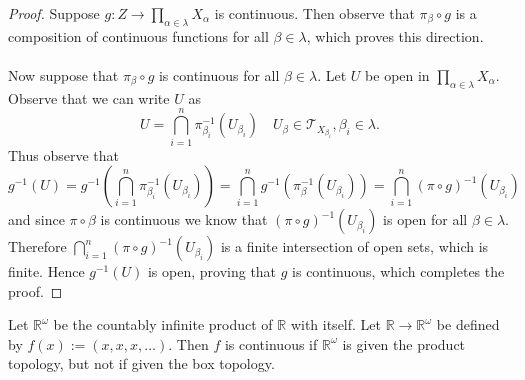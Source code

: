 \documentclass[letter,12pt,twoside]{hmcpset}
\begin{document}
\begin{proof}
    Suppose $g: Z \to \prod\limits_{\alpha\in \lambda}X_\alpha$
    is continuous. Then observe that $\pi_\beta \circ g$ is a
    composition of continuous functions for all $\beta \in \lambda$,
    which proves this direction.
    \\
    \\
    Now suppose that $\pi_\beta \circ g$ is continuous for all $\beta
    \in \lambda$. Let $U$ be open in $\prod\limits_{\alpha \in
    \lambda} X_\alpha$. Observe that we can write $U$ as 
    \[
        U = \bigcap\limits_{i = 1}^{n} \pi^{-1}_{\beta_i}(U_{\beta_i}) \quad U_{\beta} \in \mathscr{T}_{X_{\beta_i}}, \beta_i \in \lambda.
    \]
    Thus observe that 
    \[ 
        g^{-1}(U) = g^{-1}\left(\bigcap\limits_{i = 1}^{n}
        \pi^{-1}_{\beta_i}(U_{\beta_i})\right) 
        =
        \bigcap_{i = 1}^{n} g^{-1}(\pi^{-1}_{\beta} (U_{\beta_i}))
        = 
        \bigcap_{i = 1}^{n} (\pi \circ g)^{-1}(U_{\beta_i})    
    \]
    and since $\pi \circ \beta$ is continuous we know that 
    $(\pi \circ g)^{-1}(U_{\beta_i})$ is open for all $\beta \in
    \lambda$. Therefore $\bigcap_{i = 1}^{n} (\pi \circ
    g)^{-1}(U_{\beta_i})$
    is a finite intersection of open sets, which is finite. Hence
    $g^{-1}(U)$ is open, proving that $g$ is continuous, which
    completes the proof.
    



\end{proof}

\begin{problem}[Theorem 8.41]
    Let $\mathbb{R}^{\omega}$ be the countably infinite product of
    $\mathbb{R}$ with itself. Let $\mathbb{R} \to \mathbb{R}^{\omega}$
    be defined by $f(x) := (x, x, x, \dots )$. Then $f$ is continuous
    if $\mathbb{R}^{\omega}$ is given the product topology, but not if
    given the box topology. 
\end{problem}
\end{document}
